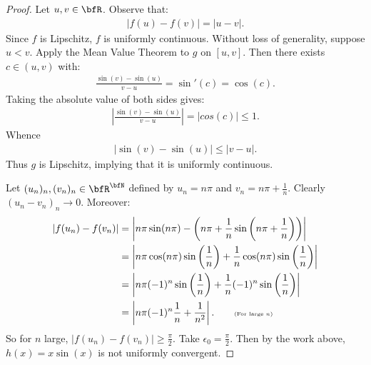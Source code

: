\documentclass[11pt,twoside,openany]{memoir}
\begin{document}
        \begin{proof}
            Let $u,v \in \bfR$. Observe that:
                \begin{equation*}
                \begin{split}
                    |f(u) - f(v)| = |u-v|.
                \end{split}
                \end{equation*}
            Since $f$ is Lipschitz, $f$ is uniformly continuous. Without loss of generality, suppose $u  <v$. Apply the Mean Value Theorem to $g$ on $[u,v]$. Then there exists $c \in (u,v)$ with:
                \begin{equation*}
                \begin{split}
                    \frac{\sin(v) - \sin(u)}{v-u} = \sin'(c) = \cos(c).
                \end{split}
                \end{equation*}
            Taking the absolute value of both sides gives:
                \begin{equation*}
                \begin{split}
                    \left|\frac{\sin(v) - \sin(u)}{v-u}\right| = |cos(c)| \leq 1.
                \end{split}
                \end{equation*}
            Whence
                \begin{equation*}
                \begin{split}
                    |\sin(v) - \sin(u)| \leq |v-u|.
                \end{split}
                \end{equation*}
            Thus $g$ is Lipschitz, implying that it is uniformly continuous. \nl
            
            Let $(u_n)_n,(v_n)_n \in \bfR^\bfN$ defined by $u_n = n\pi$ and $v_n = n\pi + \frac{1}{n}$. Clearly $(u_n - v_n)_n \rightarrow 0$. Moreover:
                \begin{equation*}
                \begin{split}
                    |f(u_n) - f(v_n)|
                    & = \left|n\pi\sin(n\pi) - \left(n\pi + \frac{1}{n}\sin \left(n\pi + \frac{1}{n}\right)\right)\right| \\
                    & = \left|n\pi\cos(n\pi)\sin \left(\frac{1}{n}\right) + \frac{1}{n}\cos(n\pi)\sin \left(\frac{1}{n}\right)\right| \\
                    & = \left|n\pi(-1)^n \sin\left(\frac{1}{n}\right)+ \frac{1}{n}(-1)^n\sin \left(\frac{1}{n}\right)\right| \\
                    & = \left|n\pi (-1)^n \frac{1}{n} + \frac{1}{n^2}\right|. \quad\quad \text{\tiny (For large $n$)}
                \end{split}
                \end{equation*}
            So for $n$ large, $|f(u_n) - f(v_n)| \geq \frac{\pi}{2}$. Take $\epsilon_0 = \frac{\pi}{2}$. Then by the work above, $h(x) = x\sin(x)$ is not uniformly convergent.
        \end{proof}
\end{document}
